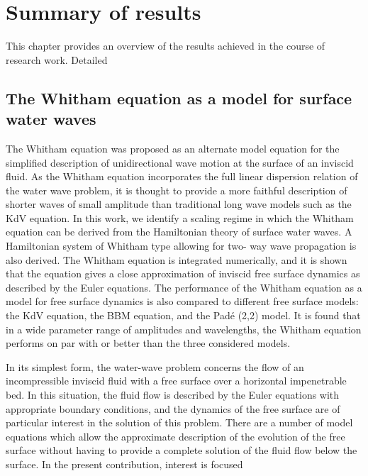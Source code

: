 \chapter{Summary of results}

This chapter provides an overview of the results achieved in the course of research work. 
Detailed 

\section{The Whitham equation as a model for surface water waves}

The Whitham equation was proposed as an alternate model equation for the simplified description of unidirectional 
wave motion at the surface of an inviscid fluid. As the Whitham equation incorporates the full
linear dispersion relation of the water wave problem, it is thought to provide a more faithful description
of shorter waves of small amplitude than traditional long wave models such as the KdV equation.
In this work, we identify a scaling regime in which the Whitham equation can be derived from the
Hamiltonian theory of surface water waves. A Hamiltonian system of Whitham type allowing for two-
way wave propagation is also derived. The Whitham equation is integrated numerically, and it is shown
that the equation gives a close approximation of inviscid free surface dynamics as described by the
Euler equations. The performance of the Whitham equation as a model for free surface dynamics is also
compared to different free surface models: the KdV equation, the BBM equation, and the Padé (2,2) model.
It is found that in a wide parameter range of amplitudes and wavelengths, the Whitham equation performs
on par with or better than the three considered models.


In its simplest form, the water-wave problem concerns the
flow of an incompressible inviscid fluid with a free surface over
a horizontal impenetrable bed. In this situation, the fluid flow
is described by the Euler equations with appropriate boundary
conditions, and the dynamics of the free surface are of particular
interest in the solution of this problem.
There are a number of model equations which allow the
approximate description of the evolution of the free surface
without having to provide a complete solution of the fluid flow
below the surface. In the present contribution, interest is focused

